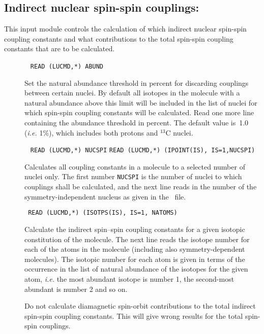 \subsection{Indirect nuclear spin-spin couplings:
}\label{sec:spin-s}

This input module controls the calculation of which indirect nuclear
spin-spin coupling constants and what contributions to the total
spin-spin coupling constants that are to be calculated.

\begin{description}
\item[]\verb| |\newline
\verb|READ (LUCMD,*) ABUND|

Set the natural abundance threshold in percent
for discarding couplings between certain nuclei.
By default all isotopes in the molecule with a natural
abundance above this limit will be included in the list of nuclei for which
spin-spin coupling constants will be calculated. Read one more line
containing the abundance threshold in percent. The default value is~1.0 ({\it i.e.\/} 1\%),
which includes both protons and $^{13}$C nuclei.

\item[]\verb| |\newline
\verb|READ (LUCMD,*) NUCSPI|\newline
\verb|READ (LUCMD,*) (IPOINT(IS), IS=1,NUCSPI)|

Calculates all coupling constants in a molecule to a selected number
of nuclei only. The first number \verb|NUCSPI| is the number of nuclei
to which couplings shall be calculated, and the next line reads in
the number of the symmetry-independent nucleus as given in the
\molinp\ file.

\item[]\verb| |\newline
\verb|READ (LUCMD,*) (ISOTPS(IS), IS=1, NATOMS)|

Calculate the indirect spin--spin coupling constants for a given
isotopic constitution of the molecule. The next line reads the isotope
number for each of the atoms in the molecule (including also
symmetry-dependent molecules). The isotopic number for each atom is
given in terms of the occurrence in the list of natural abundance of
the isotopes for the given atom, {\it i.e.\/} the most abundant
isotope is number 1, the second-most abundant is number 2 and so on.

\item[] Do not calculate diamagnetic
spin-orbit
contributions to the total indirect spin-spin
coupling constants. This
will give wrong results for the total spin-spin couplings.


\end{description}
